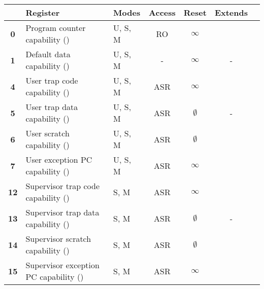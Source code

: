 \begin{table}[h!]
\centering
\begin{tabular}{cllcccc@{}}
\toprule
& \textbf{Register} & \textbf{Modes} & \textbf{Access} & \textbf{Reset} & \textbf{Extends} \\ \midrule
\textbf{0} & Program counter capability (\PCC{})     & U, S, M & RO & $\infty$ & \PC{} \\
\textbf{1} & Default data capability (\DDC{})        & U, S, M & -  & $\infty$ & -     \\
[1.5em]
\textbf{4} & User trap code capability (\UTCC{})     & U, S, M & ASR & $\infty$    & \utvec{} \\
\textbf{5} & User trap data capability (\UTDC{})     & U, S, M & ASR & $\emptyset$ & -        \\
\textbf{6} & User scratch capability (\UScratchC{})  & U, S, M & ASR & $\emptyset$ & \uscratch{}  \\
\textbf{7} & User exception PC capability (\UEPCC{}) & U, S, M & ASR & $\infty$    & \uepc{} \\
[1.5em]

\textbf{12} & Supervisor trap code capability (\STCC{})     & S, M & ASR & $\infty$    & \stvec{} \\
\textbf{13} & Supervisor trap data capability (\STDC{})     & S, M & ASR & $\emptyset$ & -        \\
\textbf{14} & Supervisor scratch capability (\SScratchC{})  & S, M & ASR & $\emptyset$ & \sscratch{} \\
\textbf{15} & Supervisor exception PC capability (\SEPCC{}) & S, M & ASR & $\infty$    & \sepc{}  \\
[1.5em]


\end{tabular}
\end{table}
